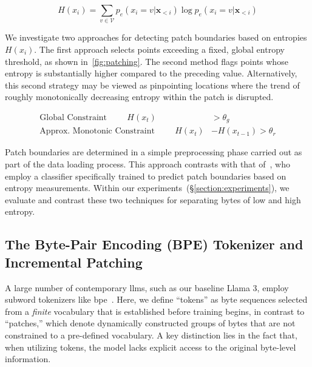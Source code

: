 \begin{equation}
H(x_i) = \sum_{v \in \mathcal{V}} p_{e}(x_i=v|\pmb{x}_{<i}) \log p_{e}(x_i=v|\pmb{x}_{<i})
\end{equation}

We investigate two approaches for detecting patch boundaries based on entropies $H(x_i)$. The first approach selects points exceeding a fixed, global entropy threshold, as shown in~\autoref{fig:patching}. The second method flags points whose entropy is substantially higher compared to the preceding value. Alternatively, this second strategy may be viewed as pinpointing locations where the trend of roughly monotonically decreasing entropy within the patch is disrupted.

\begin{align*}
    \text{Global Constraint}\hspace{1cm}H(x_t)& > \theta_g\\
    \text{Approx. Monotonic Constraint}\hspace{1cm}H(x_t)& - H(x_{t-1}) > \theta_r
\end{align*}

Patch boundaries are determined in a simple preprocessing phase carried out as part of the data loading process. This approach contrasts with that of~\citet{nawrot-etal-2023-efficient}, who employ a classifier specifically trained to predict patch boundaries based on entropy measurements. Within our experiments~(\S\ref{section:experiments}), we evaluate and contrast these two techniques for separating bytes of low and high entropy.

\subsection{The Byte-Pair Encoding (BPE) Tokenizer and Incremental Patching}
\label{section:incremental-patching}
\label{section:bpe-patch}

A large number of contemporary llms, such as our baseline Llama 3, employ subword tokenizers like bpe~\citep{gage1994new, sennrich-etal-2016-neural}. Here, we define ``tokens'' as byte sequences selected from a \textit{finite} vocabulary that is established before training begins, in contrast to ``patches,'' which denote dynamically constructed groups of bytes that are not constrained to a pre-defined vocabulary. A key distinction lies in the fact that, when utilizing tokens, the model lacks explicit access to the original byte-level information.

